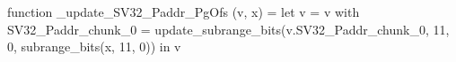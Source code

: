 function _update_SV32_Paddr_PgOfs (v, x) = let v = { v with SV32_Paddr_chunk_0 = update_subrange_bits(v.SV32_Paddr_chunk_0, 11, 0, subrange_bits(x, 11, 0)) } in
  v
